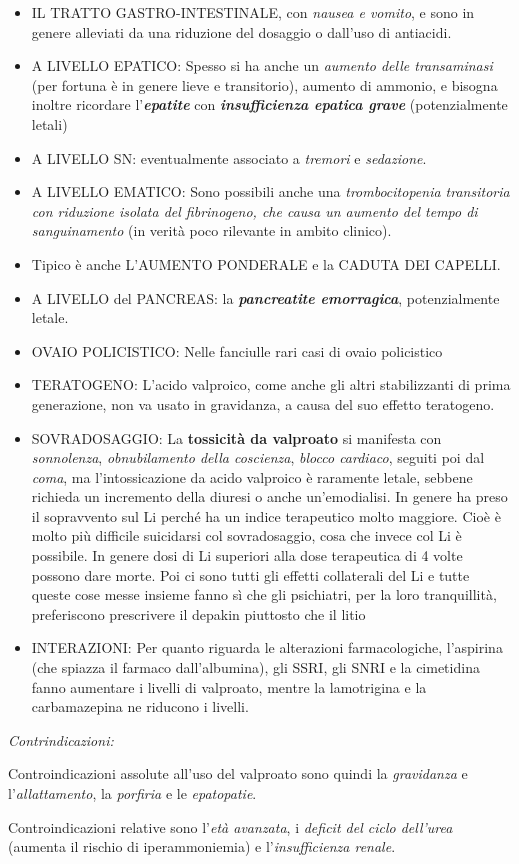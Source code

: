 \begin{itemize}
\begin{itemize}
\item
  IL TRATTO GASTRO-INTESTINALE, con \emph{nausea e vomito}, e sono in
  genere alleviati da una riduzione del dosaggio o dall'uso di
  antiacidi.
\item
  A LIVELLO EPATICO: Spesso si ha anche un \emph{aumento delle
  transaminasi} (per fortuna è in genere lieve e transitorio), aumento
  di ammonio, e bisogna inoltre ricordare l'\textbf{\emph{epatite}} con
  \textbf{\emph{insufficienza epatica grave}} (potenzialmente letali)
\item
  A LIVELLO SN: eventualmente associato a \emph{tremori} e
  \emph{sedazione}.
\item
  A LIVELLO EMATICO: Sono possibili anche una \emph{trombocitopenia
  transitoria con riduzione isolata del fibrinogeno, che causa un
  aumento del tempo di sanguinamento} (in verità poco rilevante in
  ambito clinico).
\item
  Tipico è anche L'AUMENTO PONDERALE e la CADUTA DEI CAPELLI.
\item
  A LIVELLO del PANCREAS: la \textbf{\emph{pancreatite emorragica}},
  potenzialmente letale.
\item
  OVAIO POLICISTICO: Nelle fanciulle rari casi di ovaio policistico
\item
  TERATOGENO: L'acido valproico, come anche gli altri stabilizzanti di
  prima generazione, non va usato in gravidanza, a causa del suo effetto
  teratogeno.
\item
  SOVRADOSAGGIO: La \textbf{tossicità da valproato} si manifesta con
  \emph{sonnolenza}, \emph{obnubilamento della coscienza}, \emph{blocco
  cardiaco}, seguiti poi dal \emph{coma}, ma l'intossicazione da acido
  valproico è raramente letale, sebbene richieda un incremento della
  diuresi o anche un'emodialisi. In genere ha preso il sopravvento sul
  Li perché ha un indice terapeutico molto maggiore. Cioè è molto più
  difficile suicidarsi col sovradosaggio, cosa che invece col Li è
  possibile. In genere dosi di Li superiori alla dose terapeutica di 4
  volte possono dare morte. Poi ci sono tutti gli effetti collaterali
  del Li e tutte queste cose messe insieme fanno sì che gli psichiatri,
  per la loro tranquillità, preferiscono prescrivere il depakin
  piuttosto che il litio
\item
  INTERAZIONI: Per quanto riguarda le alterazioni farmacologiche,
  l'aspirina (che spiazza il farmaco dall'albumina), gli SSRI, gli SNRI
  e la cimetidina fanno aumentare i livelli di valproato, mentre la
  lamotrigina e la carbamazepina ne riducono i livelli.
\end{itemize}

\emph{\emph{Contrindicazioni:}}

Controindicazioni assolute all'uso del valproato sono quindi la
\emph{gravidanza} e l'\emph{allattamento}, la \emph{porfiria} e le
\emph{epatopatie}.

Controindicazioni relative sono l'\emph{età avanzata}, i \emph{deficit
del ciclo dell'urea} (aumenta il rischio di iperammoniemia) e
l'\emph{insufficienza renale}.
\end{itemize}

